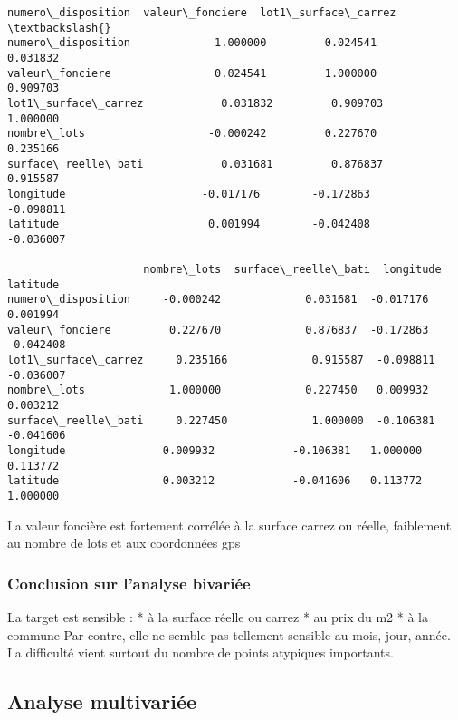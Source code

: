 \documentclass[11pt]{article}
\makeatletter
\newcommand{\boxspacing}{\kern\kvtcb@left@rule\kern\kvtcb@boxsep}
\newcommand{\prompt}[4]{
        {\ttfamily\llap{{\color{#2}[#3]:\hspace{3pt}#4}}\vspace{-\baselineskip}}
    }
\makeatother
\begin{document}
            \begin{tcolorbox}[breakable, size=fbox, boxrule=.5pt, pad at break*=1mm, opacityfill=0]
\prompt{Out}{outcolor}{53}{\boxspacing}
\begin{Verbatim}[commandchars=\\\{\}]
                     numero\_disposition  valeur\_fonciere  lot1\_surface\_carrez  \textbackslash{}
numero\_disposition             1.000000         0.024541             0.031832
valeur\_fonciere                0.024541         1.000000             0.909703
lot1\_surface\_carrez            0.031832         0.909703             1.000000
nombre\_lots                   -0.000242         0.227670             0.235166
surface\_reelle\_bati            0.031681         0.876837             0.915587
longitude                     -0.017176        -0.172863            -0.098811
latitude                       0.001994        -0.042408            -0.036007

                     nombre\_lots  surface\_reelle\_bati  longitude  latitude
numero\_disposition     -0.000242             0.031681  -0.017176  0.001994
valeur\_fonciere         0.227670             0.876837  -0.172863 -0.042408
lot1\_surface\_carrez     0.235166             0.915587  -0.098811 -0.036007
nombre\_lots             1.000000             0.227450   0.009932  0.003212
surface\_reelle\_bati     0.227450             1.000000  -0.106381 -0.041606
longitude               0.009932            -0.106381   1.000000  0.113772
latitude                0.003212            -0.041606   0.113772  1.000000
\end{Verbatim}
\end{tcolorbox}
        
    La valeur foncière est fortement corrélée à la surface carrez ou réelle,
faiblement au nombre de lots et aux coordonnées gps

    \hypertarget{conclusion-sur-lanalyse-bivariuxe9e}{%
\subsubsection{Conclusion sur l'analyse
bivariée}\label{conclusion-sur-lanalyse-bivariuxe9e}}

La target est sensible : * à la surface réelle ou carrez * au prix du m2
* à la commune Par contre, elle ne semble pas tellement sensible au
mois, jour, année. La difficulté vient surtout du nombre de points
atypiques importants.

    \hypertarget{analyse-multivariuxe9e}{%
\subsection{Analyse multivariée}\label{analyse-multivariuxe9e}}
\end{document}
